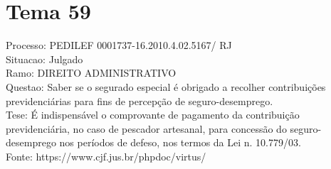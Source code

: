 \documentclass[12pt]{article}
\begin{document}
\section*{Tema 59}
Processo: PEDILEF 0001737-16.2010.4.02.5167/ RJ\\
Situacao: Julgado\\
Ramo: DIREITO ADMINISTRATIVO\\
Questao: Saber se o segurado especial é obrigado a recolher contribuições previdenciárias para fins de percepção de seguro-desemprego.\\
Tese: É indispensável o comprovante de pagamento da contribuição previdenciária, no caso de pescador artesanal, para concessão do seguro-desemprego nos períodos de defeso, nos termos da Lei n. 10.779/03.\\
Fonte: https://www.cjf.jus.br/phpdoc/virtus/
\end{document}
